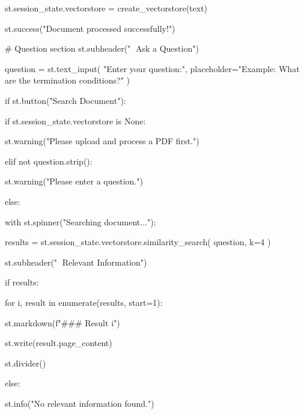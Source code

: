                     st.session_state.vectorstore = create_vectorstore(text)

                    st.success("Document processed successfully!")


# Question section
st.subheader("💬 Ask a Question")

question = st.text_input(
    "Enter your question:",
    placeholder="Example: What are the termination conditions?"
)


if st.button("Search Document"):

    if st.session_state.vectorstore is None:

        st.warning("Please upload and process a PDF first.")

    elif not question.strip():

        st.warning("Please enter a question.")

    else:

        with st.spinner("Searching document..."):

            results = st.session_state.vectorstore.similarity_search(
                question,
                k=4
            )

        st.subheader("📌 Relevant Information")

        if results:

            for i, result in enumerate(results, start=1):

                st.markdown(f"### Result {i}")

                st.write(result.page_content)

                st.divider()

        else:

            st.info("No relevant information found.")